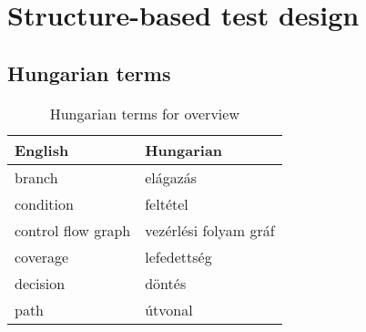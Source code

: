 \chapter{Structure-based test design}



\section{Hungarian terms}

\begin{table}
    \centering
    \small
    \caption{Hungarian terms for overview}
    \begin{tabular}{ll}
        \toprule
        \textbf{English} & \textbf{Hungarian} \\
        \midrule
        branch & elágazás \\
        condition & feltétel \\
        control flow graph & vezérlési folyam gráf \\
        coverage & lefedettség \\        
        decision & döntés \\
        path & útvonal \\
        \bottomrule
        \end{tabular}
        \label{tab:overview:hungarian-terms-testing-structure}
        \end{table} 